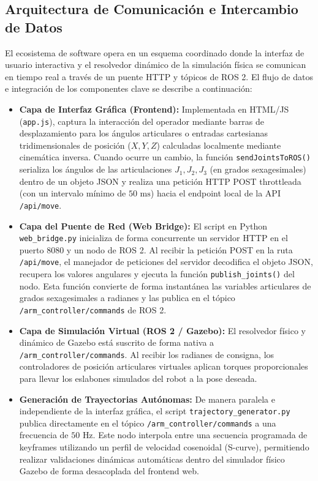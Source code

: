 \documentclass[conference,a4paper]{IEEEtran}
\begin{document}
\subsection{Arquitectura de Comunicación e Intercambio de Datos}
El ecosistema de software opera en un esquema coordinado donde la interfaz de usuario interactiva y el resolvedor dinámico de la simulación física se comunican en tiempo real a través de un puente HTTP y tópicos de ROS 2. El flujo de datos e integración de los componentes clave se describe a continuación:
\begin{itemize}
    \item \textbf{Capa de Interfaz Gráfica (Frontend):} Implementada en HTML/JS (\texttt{app.js}), captura la interacción del operador mediante barras de desplazamiento para los ángulos articulares o entradas cartesianas tridimensionales de posición ($X, Y, Z$) calculadas localmente mediante cinemática inversa. Cuando ocurre un cambio, la función \texttt{sendJointsToROS()} serializa los ángulos de las articulaciones $J_1, J_2, J_3$ (en grados sexagesimales) dentro de un objeto JSON y realiza una petición HTTP POST throttleada (con un intervalo mínimo de $50\text{ ms}$) hacia el endpoint local de la API \texttt{/api/move}.
    \item \textbf{Capa del Puente de Red (Web Bridge):} El script en Python \texttt{web\_bridge.py} inicializa de forma concurrente un servidor HTTP en el puerto $8080$ y un nodo de ROS 2. Al recibir la petición POST en la ruta \texttt{/api/move}, el manejador de peticiones del servidor decodifica el objeto JSON, recupera los valores angulares y ejecuta la función \texttt{publish\_joints()} del nodo. Esta función convierte de forma instantánea las variables articulares de grados sexagesimales a radianes y las publica en el tópico \texttt{/arm\_controller/commands} de ROS 2.
    \item \textbf{Capa de Simulación Virtual (ROS 2 / Gazebo):} El resolvedor físico y dinámico de Gazebo está suscrito de forma nativa a \texttt{/arm\_controller/commands}. Al recibir los radianes de consigna, los controladores de posición articulares virtuales aplican torques proporcionales para llevar los eslabones simulados del robot a la pose deseada.
    \item \textbf{Generación de Trayectorias Autónomas:} De manera paralela e independiente de la interfaz gráfica, el script \texttt{trajectory\_generator.py} publica directamente en el tópico \texttt{/arm\_controller/commands} a una frecuencia de $50\text{ Hz}$. Este nodo interpola entre una secuencia programada de keyframes utilizando un perfil de velocidad cosenoidal (S-curve), permitiendo realizar validaciones dinámicas automáticas dentro del simulador físico Gazebo de forma desacoplada del frontend web.
\end{itemize}
\end{document}
